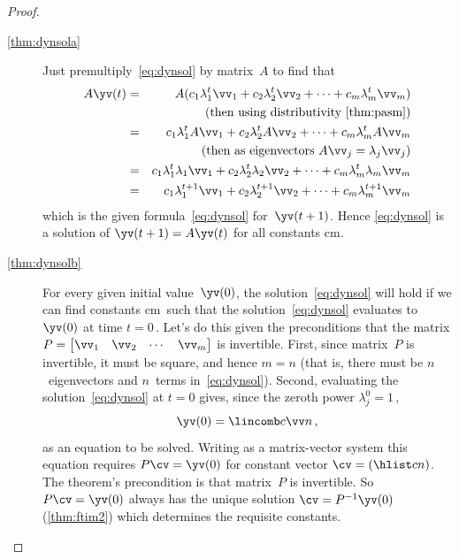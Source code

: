 \begin{proof} \ 
\begin{description}
\item[\ref{thm:dynsola}] 
Just premultiply~\eqref{eq:dynsol} by matrix~\(A\) to find that
\begin{eqnarray*}
A\yv(t)&=&A(c_1\lambda_1^t\vv_1+c_2\lambda_2^t\vv_2+\cdots+c_m\lambda_m^t\vv_m)
\\&&\quad(\text{then using distributivity \autoref{thm:pasm}})
\\&=&c_1\lambda_1^tA\vv_1+c_2\lambda_2^tA\vv_2+\cdots+c_m\lambda_m^tA\vv_m
\\&&\quad(\text{then as eigenvectors }A\vv_j=\lambda_j\vv_j)
\\&=&c_1\lambda_1^t\lambda_1\vv_1+c_2\lambda_2^t\lambda_2\vv_2+\cdots+c_m\lambda_m^t\lambda_m\vv_m
\\&=&c_1\lambda_1^{t+1}\vv_1+c_2\lambda_2^{t+1}\vv_2+\cdots+c_m\lambda_m^{t+1}\vv_m
\end{eqnarray*}
which is the given formula~\eqref{eq:dynsol} for~\(\yv(t+1)\).
Hence \eqref{eq:dynsol} is a solution of \(\yv(t+1)=A\yv(t)\) for all constants \hlist cm.

\item[\ref{thm:dynsolb}]
For every given initial value~\(\yv(0)\), the solution~\eqref{eq:dynsol} will hold if we can find constants \hlist cm\ such that the solution~\eqref{eq:dynsol} evaluates to~\(\yv(0)\) at time \(t=0\)\,.
Let's do this given the preconditions that 
the matrix \(P=\begin{bmatrix} \vv_1&\vv_2&\cdots&\vv_m \end{bmatrix}\) is {invertible}.
First, since matrix~\(P\) is invertible, it must be square, and hence \(m=n\) (that is, there must be \(n\)~eigenvectors and \(n\)~terms in~\eqref{eq:dynsol}).
Second, evaluating the solution~\eqref{eq:dynsol} at \(t=0\) gives, since the zeroth power \(\lambda_j^0=1\)\,,
\begin{equation*}
\yv(0)=\lincomb c\vv n\,,
\end{equation*}
as an equation to be solved.
Writing as a matrix-vector system this equation requires \(P\cv=\yv(0)\) for constant vector \(\cv=(\hlist cn)\).
The theorem's precondition is that matrix~\(P\) is invertible.
So \(P\cv=\yv(0)\) always has the unique solution \(\cv=P^{-1}\yv(0)\) (\autoref{thm:ftim2}) which determines the requisite constants.
\end{description}
\end{proof}




